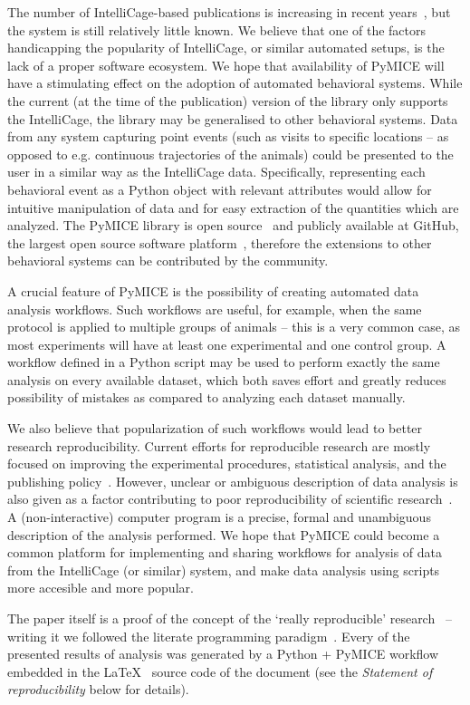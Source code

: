 The number of
IntelliCage-based publications is increasing in recent years~\cite{IntelliCageReferenceList},
but the system is still relatively little known. We believe that one of the factors 
handicapping the popularity of IntelliCage, or similar automated setups, is the lack of a proper 
software ecosystem. We hope that availability of PyMICE will have a stimulating
effect on the adoption of automated behavioral systems. 
While the current (at the time of the publication) version of the library  
only supports the IntelliCage, the library may be generalised to other behavioral systems. 
Data from any system capturing point events (such as
visits to specific locations -- as opposed to e.g. continuous trajectories of the animals) 
could be presented to the user in a similar way as the IntelliCage data. 
Specifically, representing each behavioral event as a Python object
with relevant attributes would allow for intuitive manipulation of data
and for easy extraction of the quantities which are analyzed. 
The PyMICE library is open source~\cite{gpl} and publicly available at
GitHub, the largest open source software platform~\cite{gousios2014}, 
therefore the extensions to other behavioral systems can be contributed by the community. 

A crucial feature of PyMICE is the possibility of creating automated
data analysis workflows. Such workflows are useful, for example, when the same 
protocol is applied to multiple groups of animals -- this is a very common case, 
as most  experiments will have at least one experimental and one control group. 
A workflow defined in a Python script may be used to perform exactly the same
analysis on every available dataset, which both saves effort and greatly reduces
possibility of mistakes as compared to analyzing each dataset manually.

We also believe that popularization of such workflows would
lead to better research reproducibility. 
Current efforts for reproducible research are mostly focused on improving the
experimental procedures, statistical analysis, and the publishing
policy~\cite{begley2012,begley2013,halsey2015}. However, unclear or ambiguous 
description of data analysis is also given as a factor contributing to 
poor reproducibility of scientific research~\cite{ince2012}. A (non-interactive) 
computer program is a
precise, formal and unambiguous description of the analysis performed.
We hope that PyMICE could become a common platform for implementing
and sharing workflows for analysis of data from the IntelliCage (or similar) system, and
make data analysis using scripts more accesible and more popular.

The paper itself is a proof of the concept of the `really reproducible'
research~\cite{buckheit1995} -- writing it we followed the
literate programming paradigm~\cite{literateProgramming}. Every of the presented
results of analysis was generated by a Python + PyMICE workflow embedded in the
\LaTeX{}~\cite{latex} source code of the document (see the \emph{Statement of reproducibility} below for
details).

